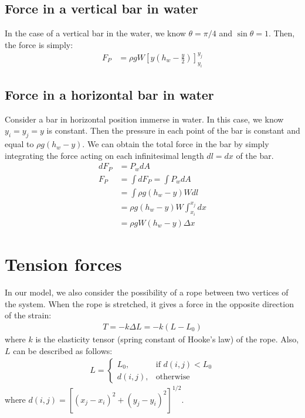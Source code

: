 \documentclass[12pt]{article}
\begin{document}
\subsection{Force in a vertical bar in water}
In the case of a vertical bar in the water, we know $\theta = \pi/4$ and $\sin\theta = 1$. Then, the force is simply:
\begin{align*}
  F_P &= \rho g W \left[ y \left(h_w - \frac{y}{2} \right) \right]_{y_i}^{y_j}
\end{align*}

\subsection{Force in a horizontal bar in water}
Consider a bar in horizontal position immerse in water. In this case, we know $y_i = y_j = y$ is constant. Then the pressure in each point of the bar is constant and equal to $\rho g (h_w - y)$. We can obtain the total force in the bar by simply integrating the force acting on each infinitesimal length $dl = dx$ of the bar. 
\begin{align*}
  dF_P &= P_w dA \\
  F_P &= \int dF_P = \int P_w dA\\
  &= \int \rho g (h_w - y) W dl\\
  &= \rho g (h_w - y) W \int_{x_i}^{x_j}  dx\\
  &= \rho g W (h_w - y) \Delta x
\end{align*}

\section{Tension forces}
In our model, we also consider the possibility of a rope between two vertices of the system. When the rope is stretched, it gives a force in the opposite direction of the strain:
\begin{align*}
  T = -k \Delta L = -k (L - L_0)
\end{align*}
where $k$ is the elasticity tensor (spring constant of Hooke's law) of the rope.
Also, $L$ can be described as follows:
\begin{align*}
L = 
\begin{cases}
    L_0,& \text{if } d(i,j) < L_0\\
    d(i,j),              & \text{otherwise}
\end{cases}
\end{align*}
where $d(i,j) = \left[ (x_j-x_i)^2 + (y_j - y_i)^2 \right]^{1/2}$.
\end{document}
